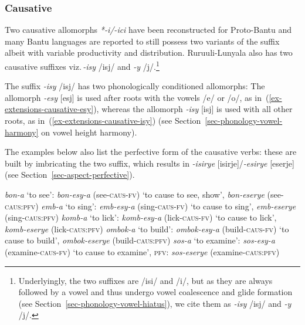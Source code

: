 \subsubsection{Causative}\label{sec-extension-causative}

Two causative allomorphs \textit{*-i/-ici} have been reconstructed for Proto-Bantu \citep[173]{Schadebergetal2019Bantu} and many Bantu languages are reported to still possess two variants of the suffix albeit with variable productivity and distribution. 
Ru\-ruu\-li\hyp{}Lu\-nya\-la also has two causative suffixes viz.\,\textit{-isy} /isj/ and \textit{-y} /j/.\footnote{Underlyingly, the two suffixes are /isi/ and /i/, but as they are always followed by a vowel and thus undergo vowel coalescence and glide formation (see Section~\ref{sec-phonology-vowel-hiatus}), we cite them as \textit{-isy} /isj/ and \textit{-y} /j/.\label{fn-isi-caus}}

The suffix \textit{-isy} /isj/ has two phonologically conditioned allomorphs: The allomorph \textit{-esy} [esj] is used after roots with the vowels /e/ or /o/, as in~(\ref{ex-extensions-causative-esy}), 
whereas the allomorph \textit{-isy} [isj] is used with all other roots, as in~(\ref{ex-extensions-causative-isy}) (see Section~\ref{sec-phonology-vowel-harmony} on vowel height harmony). 

The examples below also list the perfective form of the causative verbs: these are built by imbricating the two suffix, which results in \textit{-isirye} [isirje]/\textit{-esirye} [eserje] (see Section~\ref{sec-aspect-perfective}).

\ea \label{ex-extensions-causative-esy}
\begin{xlist}
\ex\textit{bon-a} `to see':  \textit{bon-esy-a} (see-\textsc{caus}-\textsc{fv}) `to cause to see, show', 
\textit{bon-eserye} (see-\textsc{caus}:\textsc{pfv})
\ex\textit{emb-a} `to sing':  \textit{emb-esy-a} (sing-\textsc{caus}-\textsc{fv}) `to cause to sing',  \textit{emb-eserye}
(sing-\textsc{caus}:\textsc{pfv})
\ex\textit{komb-a} `to lick':   \textit{komb-esy-a} (lick-\textsc{caus}-\textsc{fv}) `to cause to lick', \textit{komb-eserye} 
(lick-\textsc{caus}:\textsc{pfv})
\ex\textit{ombok-a} `to build':  \textit{ombok-esy-a} (build-\textsc{caus}-\textsc{fv}) `to cause to build', \textit{ombok-eserye} (build-\textsc{caus}:\textsc{pfv})
\ex\textit{sos-a} `to examine':   \textit{sos-esy-a} (examine-\textsc{caus}-\textsc{fv}) `to cause to examine', \textsc{pfv}: \textit{sos-eserye} (examine-\textsc{caus}:\textsc{pfv})
\end{xlist}
\z

